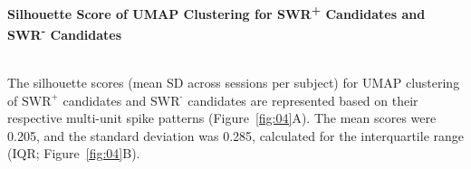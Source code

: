 \caption{\textbf{Silhouette Score of UMAP Clustering for SWR\textsuperscript{+} Candidates and SWR\textsuperscript{-} Candidates}}
\smallskip
\\
The silhouette scores (mean \textpm SD across sessions per subject) for UMAP clustering of $\text{SWR}^\text{+}$ candidates and $\text{SWR}^\text{-}$ candidates are represented based on their respective multi-unit spike patterns (Figure~\ref{fig:04}A). The mean scores were 0.205, and the standard deviation was 0.285, calculated for the interquartile range (IQR; Figure~\ref{fig:04}B).
